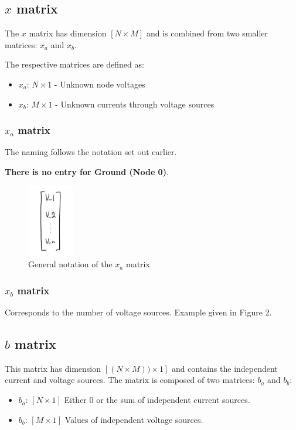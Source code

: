 \documentclass[a4paper, titlepage]{article}
\begin{document}
    \subsection{$x$ matrix}
    The $x$ matrix has dimension $[N \times M]$ and is combined from two smaller matrices: $x_a$ and $x_b$. 
    \par
    The respective matrices are defined as:
    \begin{itemize}
        \item $x_a$: $N \times 1$ - Unknown node voltages
        \item $x_b$: $M \times 1$ - Unknown currents through voltage sources
    \end{itemize}
    \subsubsection{$x_a$ matrix}
    The naming follows the notation set out earlier. \par 
    \textbf{There is no entry for Ground (Node 0)}.
    \begin{figure}[htp]
        \centering
        \includegraphics[width=20mm,scale=0.25]{Matrix4}
        \caption{General notation of the $x_a$ matrix}
        \label{fig:figure3}
    \end{figure}
    \subsubsection{$x_b$ matrix}
    Corresponds to the number of voltage sources. Example given in Figure 2.

    \subsection{$b$ matrix}
    This matrix has dimension $[(N \times M)) \times 1]$ and contains the independent 
    current and voltage sources.
    The matrix is composed of two matrices: $b_a$ and $b_b$:
    \begin{itemize}
        \item $b_a$: $[N \times 1]$ Either 0 or the sum of independent current sources.
        \item $b_b$: $[M \times 1]$ Values of independent voltage sources.
    \end{itemize}
\end{document}
